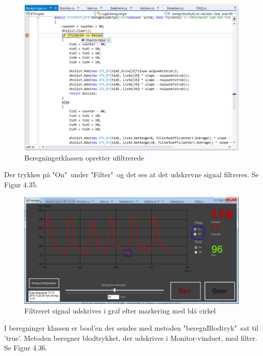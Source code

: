 \begin{figure}[H]
	\centering
	\includegraphics[width=1\textwidth]{Figurer/Test_Aktiver_2}
	\caption{Beregningerklassen opretter ufiltrerede}
\end{figure}

Der trykkes på "On"\ under "Filter"\ og det ses at det udskrevne signal filtreres. Se Figur 4.35.

\begin{figure}[H]
	\centering
	\includegraphics[width=1\textwidth]{Figurer/Test_Aktiver_3}
	\caption{Filtreret signal udskrives i graf efter markering med blå cirkel}
\end{figure}

I beregninger klassen er bool'en der sendes med metoden "beregnBlodtryk"\ sat til 'true'. Metoden beregner blodtrykket, der udskrives i Monitor-vinduet, med filter. Se Figur 4.36.

